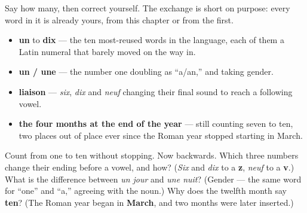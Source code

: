 Say how many, then correct yourself. The exchange is short on purpose: every word in it is already yours, from this chapter or from the first.

\begin{grammarlens}[title={What you've built this chapter}]
\begin{itemize}
\raggedright
  \item \textbf{un} to \textbf{dix} — the ten most-reused words in the language, each of them a Latin numeral that barely moved on the way in.
  \item \textbf{un / une} — the number one doubling as \textquotedblleft{}a/an,\textquotedblright{} and taking gender.
  \item \textbf{liaison} — \emph{six}, \emph{dix} and \emph{neuf} changing their final sound to reach a following vowel.
  \item \textbf{the four months at the end of the year} — still counting seven to ten, two places out of place ever since the Roman year stopped starting in March.
\end{itemize}
\end{grammarlens}

\begin{tcolorbox}[breakable,colback=teal!4,colframe=teal!35!black,title={Before you move on}]
Count from one to ten without stopping. Now backwards. Which three numbers change their ending before a vowel, and how? (\emph{Six} and \emph{dix} to a \textbf{z}, \emph{neuf} to a \textbf{v}.) What is the difference between \emph{un jour} and \emph{une nuit}? (Gender — the same word for \textquotedblleft{}one\textquotedblright{} and \textquotedblleft{}a,\textquotedblright{} agreeing with the noun.) Why does the twelfth month say \textbf{ten}? (The Roman year began in \textbf{March}, and two months were later inserted.)
\end{tcolorbox}
